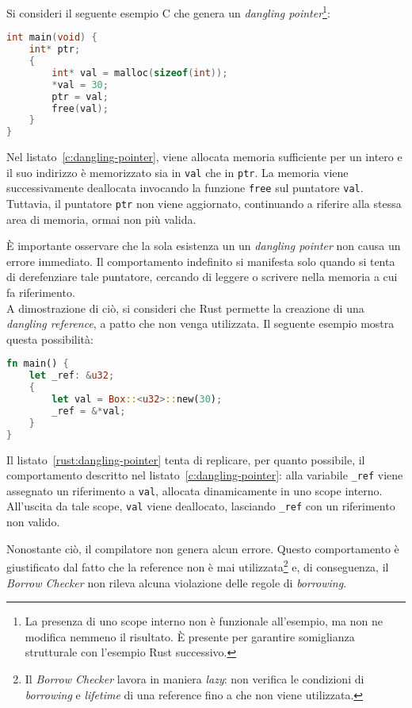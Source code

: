Si consideri il seguente esempio C che genera un \textit{dangling pointer}\footnote{La presenza di uno scope interno non è funzionale all'esempio, ma non ne modifica nemmeno il risultato. È presente per garantire somiglianza strutturale con l'esempio Rust successivo.}:
\begin{lstlisting}[language=C, caption={Dangling pointer in C}, label={c:dangling-pointer}]
int main(void) {
    int* ptr;
    {
        int* val = malloc(sizeof(int));
        *val = 30;
        ptr = val;
        free(val);
    }
}
\end{lstlisting}
Nel listato~\ref{c:dangling-pointer}, viene allocata memoria sufficiente per un intero e il suo indirizzo è memorizzato 
sia in \texttt{val} che in \texttt{ptr}. La memoria viene successivamente deallocata invocando la funzione \texttt{free} sul puntatore \texttt{val}.
Tuttavia, il puntatore \texttt{ptr} non viene aggiornato, continuando a riferire alla stessa area di memoria, ormai non più valida.

È importante osservare che la sola esistenza un un \textit{dangling pointer} non causa un errore immediato.
Il comportamento indefinito si manifesta solo quando si tenta di derefenziare tale puntatore, cercando di leggere o scrivere nella memoria a cui fa riferimento. \hfill
\vspace{12pt}\\
\noindent A dimostrazione di ciò, si consideri che Rust permette la creazione di una \textit{dangling reference}, a patto che non venga utilizzata.
Il seguente esempio mostra questa possibilità:
\begin{lstlisting}[language=Rust, caption={Dangling reference in Rust}, label={rust:dangling-pointer}]
fn main() {
    let _ref: &u32;
    {
        let val = Box::<u32>::new(30);
        _ref = &*val;
    }
}
\end{lstlisting}
Il listato~\ref{rust:dangling-pointer} tenta di replicare, per quanto possibile, il comportamento descritto nel listato~\ref{c:dangling-pointer}:
alla variabile \texttt{\_ref} viene assegnato un riferimento a \texttt{val}, allocata dinamicamente in uno scope interno. All'uscita 
da tale scope, \texttt{val} viene deallocato, lasciando \texttt{\_ref} con un riferimento non valido. 

Nonostante ciò, il compilatore non genera alcun errore.
Questo comportamento è giustificato dal fatto che la reference non è mai utilizzata\footnote{Il \textit{Borrow Checker} lavora in maniera \textit{lazy}: non verifica 
le condizioni di \textit{borrowing} e \textit{lifetime} di una reference fino a che non viene utilizzata.} e, di conseguenza, il \textit{Borrow Checker} non rileva alcuna
 violazione delle regole di \textit{borrowing}.

